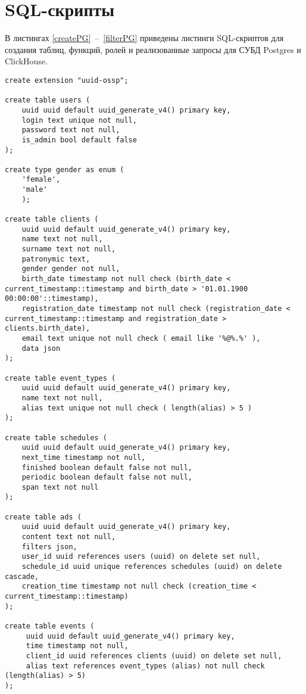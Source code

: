 \begin{appendices}
\label{appendix:graph}
	\chapter{SQL-скрипты}
	
	В листингах \ref{createPG}~--~\ref{filterPG} приведены листинги SQL-скриптов для создания таблиц, функций, ролей и реализованные запросы для СУБД Postgres и ClickHouse.
	
	\begin{lstlisting}[label=createPG,caption=SQL-скрипт создания таблиц в СУБД Postgres]
create extension "uuid-ossp";

create table users (
    uuid uuid default uuid_generate_v4() primary key,
    login text unique not null,
    password text not null,
    is_admin bool default false
);

create type gender as enum (
    'female',
    'male'
    );

create table clients (
    uuid uuid default uuid_generate_v4() primary key,
    name text not null,
    surname text not null,
    patronymic text,
    gender gender not null,
    birth_date timestamp not null check (birth_date < current_timestamp::timestamp and birth_date > '01.01.1900 00:00:00'::timestamp),
    registration_date timestamp not null check (registration_date < current_timestamp::timestamp and registration_date > clients.birth_date),
    email text unique not null check ( email like '%@%.%' ),
    data json
);

create table event_types (
    uuid uuid default uuid_generate_v4() primary key,
    name text not null,
    alias text unique not null check ( length(alias) > 5 )
);

create table schedules (
    uuid uuid default uuid_generate_v4() primary key,
    next_time timestamp not null,
    finished boolean default false not null,
    periodic boolean default false not null,
    span text not null
);

create table ads (
    uuid uuid default uuid_generate_v4() primary key,
    content text not null,
    filters json,
    user_id uuid references users (uuid) on delete set null,
    schedule_id uuid unique references schedules (uuid) on delete cascade,
    creation_time timestamp not null check (creation_time < current_timestamp::timestamp)
);

create table events (
     uuid uuid default uuid_generate_v4() primary key,
     time timestamp not null,
     client_id uuid references clients (uuid) on delete set null,
     alias text references event_types (alias) not null check (length(alias) > 5)
);
	\end{lstlisting}
	

\end{appendices}
